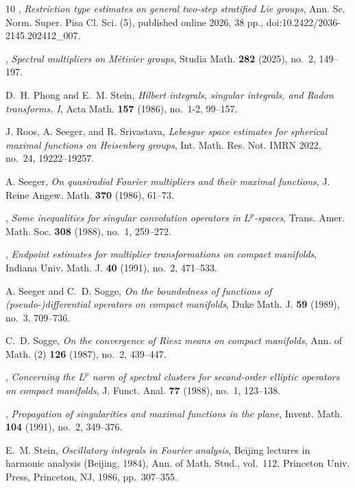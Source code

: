 \documentclass[leqno]{amsart}
\theoremstyle{definition}
\theoremstyle{remark}
\numberwithin{equation}{section}
\begin{document}
\begin{thebibliography}{10}
\bysame, \emph{{R}estriction type estimates on general two-step stratified
  {L}ie groups}, Ann. Sc. Norm. Super. Pisa Cl. Sci. (5), published online
  2026, 38 pp., doi:10.2422/2036-2145.202412\_007.

\bysame, \emph{Spectral multipliers on {M}étivier groups}, Studia Math.
  \textbf{282} (2025), no.~2, 149--197. 

D.~H. Phong and E.~M. Stein, \emph{Hilbert integrals, singular integrals,
  and Radon transforms. {I}}, Acta Math. \textbf{157} (1986), no.~1-2,
  99--157. 
  
J. Roos, A. Seeger, and R. Srivastava, \emph{Lebesgue space estimates for
  spherical maximal functions on Heisenberg groups}, Int. Math. Res. Not.
  IMRN 2022, no.~24, 19222--19257.

A. Seeger, \emph{On quasiradial {F}ourier multipliers and their maximal
  functions}, J. Reine Angew. Math. \textbf{370} (1986), 61--73.

\bysame, \emph{Some inequalities for singular convolution operators in
  {$L^p$}-spaces}, Trans. Amer. Math. Soc. \textbf{308} (1988), no.~1,
  259--272. 

\bysame, \emph{Endpoint estimates for multiplier transformations on compact
  manifolds}, Indiana Univ. Math. J. \textbf{40} (1991), no.~2, 471--533.

A. Seeger and C.~D. Sogge, \emph{On the boundedness of functions
  of (pseudo-)differential operators on compact manifolds}, Duke Math. J.
  \textbf{59} (1989), no.~3, 709--736. 

C.~D. Sogge, \emph{On the convergence of {R}iesz means on compact
  manifolds}, Ann. of Math. (2) \textbf{126} (1987), no.~2, 439--447.

\bysame, \emph{Concerning the {$L^p$} norm of spectral clusters for
  second-order elliptic operators on compact manifolds}, J. Funct. Anal.
  \textbf{77} (1988), no.~1, 123--138. 

\bysame, \emph{Propagation of singularities and maximal functions in the
  plane}, Invent. Math. \textbf{104} (1991), no.~2, 349--376.

E.~M. Stein, \emph{Oscillatory integrals in {F}ourier analysis}, Beijing
  lectures in harmonic analysis ({B}eijing, 1984), Ann. of Math. Stud.,
  vol.~112, Princeton Univ. Press, Princeton, NJ, 1986, pp.~307--355.


\end{thebibliography}
\end{document}
